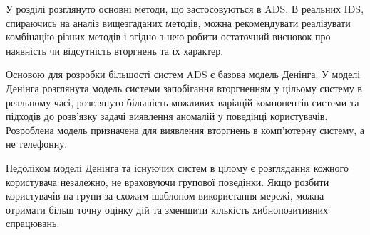     У розділі розглянуто основні методи, що застосовуються в ADS. В реальних IDS,
    спираючись на аналіз вищезгаданих методів, можна рекомендувати реалізувати
    комбінацію різних методів і згідно з нею робити остаточний висновок про наявність
    чи відсутність вторгнень та їх характер.

    Основою для розробки більшості систем ADS є базова модель Денінга. 
    У моделі Денінга розглянута модель системи запобігання вторгненням у цільому
    систему в реальному часі, розглянуто більшість можливих варіацій компонентів
    системи та підходів до розв'язку задачі виявлення аномалій у поведінці
    користувачів. Розроблена модель призначена для виявлення вторгнень в
    комп'ютерну систему, а не телефонну.

    Недоліком моделі Денінга та існуючих систем в цілому є розглядання кожного користувача незалежно,
    не враховуючи групової поведінки. Якщо розбити користувачів на групи за схожим
    шаблоном використання мережі, можна отримати більш точну оцінку дій та зменшити
    кількість хибнопозитивних спрацювань.
